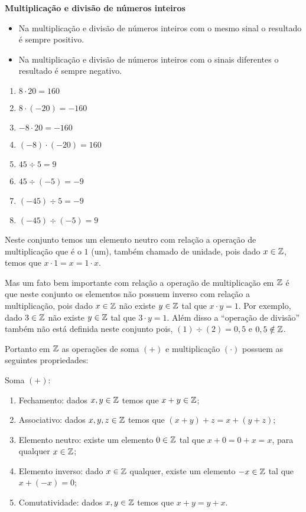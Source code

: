  \textbf{Multiplicação e divisão de números inteiros}

  \begin{itemize}
   \item Na multiplicação e divisão de números inteiros com o mesmo sinal o resultado é sempre positivo.
   \item Na multiplicação e divisão de números inteiros com o sinais diferentes o resultado é sempre negativo.
  \end{itemize}

  \begin{multicols}{2}
  \begin{enumerate}[1)]
   \item $8 \cdot 20= 160$
   \item $8 \cdot (-20)= -160$
   \item $-8 \cdot 20= -160$
   \item $(-8) \cdot (-20)= 160$
   \item $45 \div 5= 9$
   \item $45 \div (-5)= -9$
   \item $(-45) \div 5= -9$
   \item $(-45) \div (-5)= 9$
  \end{enumerate}
  \end{multicols}

 Neste conjunto temos um elemento neutro com relação a operação de multiplicação que é o $1$ (um), também chamado de unidade, pois dado $x \in \mathbb{Z}$, temos que $x \cdot 1= x= 1 \cdot x$.

 Mas um fato bem importante com relação a operação de multiplicação em $\mathbb{Z}$ é que neste conjunto os elementos não possuem inverso com relação a multiplicação, pois dado $x \in \mathbb{Z}$ não existe $y \in \mathbb{Z}$ tal que $x \cdot y= 1$. Por exemplo, dado $3 \in \mathbb{Z}$ não existe $y \in \mathbb{Z}$ tal que $3 \cdot y= 1$. Além disso a ``operação de divisão'' também não está definida neste conjunto pois, $(1)\div (2)= 0,5$ e $0,5 \notin \mathbb{Z}$.

   \vskip0.3cm

 Portanto em $\mathbb{Z}$ as operações de soma $(+)$ e multiplicação $(\cdot)$ possuem as seguintes propriedades:

 Soma $(+)$:
 \begin{enumerate}[1)]
 \item Fechamento: dados $x, y \in \mathbb{Z}$ temos que $x+y \in \mathbb{Z}$;
 \item Associativo: dados $x, y, z \in \mathbb{Z}$ temos que $(x+y)+z= x+(y+z)$;
 \item Elemento neutro: existe um elemento $0 \in \mathbb{Z}$ tal que $x+0=0+x=x$, para qualquer $x \in \mathbb{Z}$;
 \item Elemento inverso: dado $x \in \mathbb{Z}$ qualquer, existe um elemento $-x \in \mathbb{Z}$ tal que $x+(-x)=0$;
 \item Comutatividade: dados $x, y \in \mathbb{Z}$ temos que $x+y= y+x$.
 \end{enumerate}

